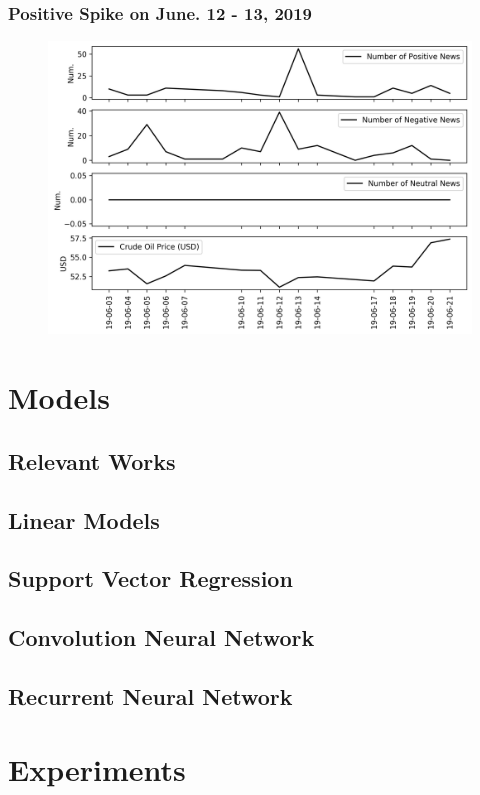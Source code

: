 \documentclass[12pt]{article}
\begin{document}
	\subsubsection{Positive Spike on June. 12 - 13, 2019}
	\begin{figure}[H]
		\centering
		\small
		\includegraphics[width=\linewidth]{figures/case_studies/20190612_10d.png}
		\caption{}
	\end{figure}
	
	\section{Models}
	\subsection{Relevant Works}
	\subsection{Linear Models}
	\subsection{Support Vector Regression}
	\subsection{Convolution Neural Network}
	\subsection{Recurrent Neural Network}
	
	\section{Experiments}
\end{document}
